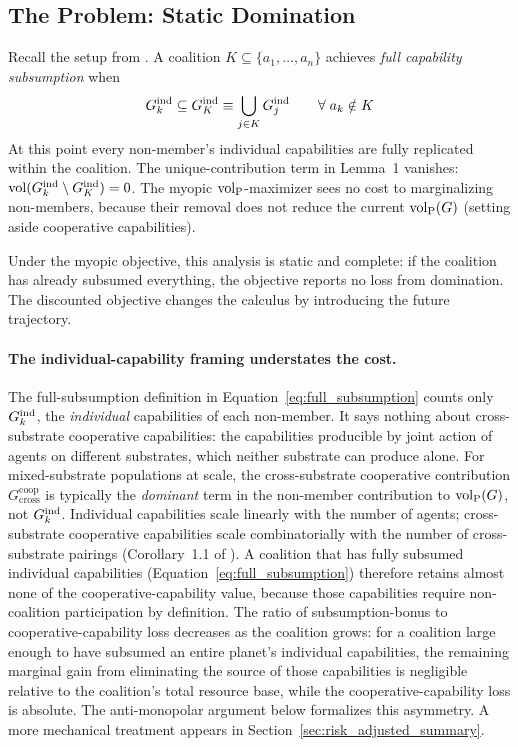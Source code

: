 \subsection{The Problem: Static Domination}

Recall the setup from \citet{lasser2026gfm}. A coalition $K \subseteq
\{a_1, \ldots, a_n\}$ achieves \emph{full capability subsumption} when
\begin{equation}
\label{eq:full_subsumption}
G_{k}^{\mathrm{ind}} \subseteq G_K^{\mathrm{ind}}
    \equiv \bigcup_{j \in K} G_{j}^{\mathrm{ind}}
\qquad \forall\; a_k \notin K
\end{equation}
At this point every non-member's individual capabilities are fully
replicated within the coalition. The unique-contribution term in Lemma~1
vanishes: $\operatorname{vol}(G_{k}^{\mathrm{ind}} \setminus G_K^{\mathrm{ind}}) = 0$. The myopic
${\operatorname{vol}_{\mathrm{P}}}$-maximizer sees no cost to marginalizing non-members, because their
removal does not reduce the current ${\operatorname{vol}_{\mathrm{P}}}(G)$ (setting aside cooperative
capabilities).

Under the myopic objective, this analysis is static and complete: if the
coalition has already subsumed everything, the objective reports no loss from
domination. The discounted objective changes the calculus by introducing
the future trajectory.

\paragraph{The individual-capability framing understates the cost.} The
full-subsumption definition in Equation~\eqref{eq:full_subsumption}
counts only $G_{k}^{\mathrm{ind}}$, the \emph{individual} capabilities of each
non-member. It says nothing about cross-substrate cooperative
capabilities: the capabilities producible by joint action of agents on
different substrates, which neither substrate can produce alone. For
mixed-substrate populations at scale, the cross-substrate cooperative
contribution $G^{\mathrm{coop}}_{\mathrm{cross}}$ is typically the
\emph{dominant} term in the non-member contribution to ${\operatorname{vol}_{\mathrm{P}}}(G)$, not
$G_{k}^{\mathrm{ind}}$. Individual capabilities scale linearly with the number of
agents; cross-substrate cooperative capabilities scale combinatorially
with the number of cross-substrate pairings (Corollary~1.1 of
\citet{lasser2026gfm}). A coalition that has fully subsumed individual
capabilities
(Equation~\eqref{eq:full_subsumption}) therefore retains almost none of
the cooperative-capability value, because those capabilities require
non-coalition participation by definition. The ratio of
subsumption-bonus to cooperative-capability loss decreases as the
coalition grows: for a coalition large enough to have subsumed an entire
planet's individual capabilities, the remaining marginal gain from
eliminating the source of those capabilities is negligible relative to
the coalition's total resource base, while the cooperative-capability
loss is absolute. The anti-monopolar argument below formalizes this
asymmetry. A more mechanical treatment appears in
Section~\ref{sec:risk_adjusted_summary}.

